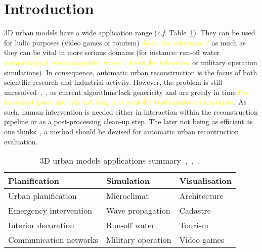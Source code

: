 \documentclass[runningheads]{llncs}
\begin{document}
\section{Introduction}
	3D urban models have a wide application range (\textit{c.f.} Table~\ref{tab::3d_applications}). They can be used for ludic purposes (video games or tourism) \textcolor{yellow}{As-tu des references ?} as much as they can be vital in more serious domains (for instance: run-off water \textcolor{yellow}{meteorological, electromagnetic waves : As-tu des references} or military operation simulations). In consequence, automatic urban reconstruction is the focus of both scientific research and industrial activity. However, the problem is still unresolved~\cite{Musialski2012},~\cite{rottensteiner2014results}, as current algorithms lack genericity and are greedy in time \textcolor{yellow}{Pas forcement grave que cela soit long si ce sont des traitements automatiques}. As such, human intervention is needed either in interaction within the reconstruction pipeline or as a post-processing clean-up step. The later not being as efficient as one thinks~\cite{Musialski2012}, a method should be devised for automatic urban recontruction evaluation.
	\begin{table}[H]
		\begin{center}
			\begin{tabular}{l l l}
				\toprule
				Planification & Simulation & Visualisation \\
				\midrule
				Urban planification & Microclimat & Architecture \\
				Emergency intervention & Wave propagation & Cadastre \\
				Interior decoration & Run-off water & Tourism \\
				Communication networks & Military operation & Video games \\
				\bottomrule
			\end{tabular}
			\caption{\label{tab::3d_applications} 3D urban models applications summary~\cite{Biljecki2015},~\cite{Scholze2002},~\cite{Wate2015}.}
		\end{center}
	\end{table}
\end{document}

